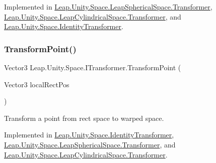 Implemented in \mbox{\hyperlink{class_leap_1_1_unity_1_1_space_1_1_leap_spherical_space_1_1_transformer_a959b6b39a26640ddbd4bcda77deefde5}{Leap.\+Unity.\+Space.\+Leap\+Spherical\+Space.\+Transformer}}, \mbox{\hyperlink{class_leap_1_1_unity_1_1_space_1_1_leap_cylindrical_space_1_1_transformer_a9ee37b1079bb46d1f4ae1e87cb3491f2}{Leap.\+Unity.\+Space.\+Leap\+Cylindrical\+Space.\+Transformer}}, and \mbox{\hyperlink{class_leap_1_1_unity_1_1_space_1_1_identity_transformer_a653673b36d9de3f837033af24b75da49}{Leap.\+Unity.\+Space.\+Identity\+Transformer}}.

\mbox{\label{interface_leap_1_1_unity_1_1_space_1_1_i_transformer_ad4ffef6002e74fe4967c4b7b9d5a5f74}} 
\subsubsection{\texorpdfstring{TransformPoint()}{TransformPoint()}}
{\footnotesize\ttfamily Vector3 Leap.\+Unity.\+Space.\+I\+Transformer.\+Transform\+Point (\begin{DoxyParamCaption}\item[{Vector3}]{local\+Rect\+Pos }\end{DoxyParamCaption})}



Transform a point from rect space to warped space. 



Implemented in \mbox{\hyperlink{class_leap_1_1_unity_1_1_space_1_1_identity_transformer_ab0c7ba8c98e532237b23e6bffb67becd}{Leap.\+Unity.\+Space.\+Identity\+Transformer}}, \mbox{\hyperlink{class_leap_1_1_unity_1_1_space_1_1_leap_spherical_space_1_1_transformer_a6ff15b9de7a7ca000bb2a565642a815e}{Leap.\+Unity.\+Space.\+Leap\+Spherical\+Space.\+Transformer}}, and \mbox{\hyperlink{class_leap_1_1_unity_1_1_space_1_1_leap_cylindrical_space_1_1_transformer_aa912ab55d4e9a20dcbfaff6717f688f9}{Leap.\+Unity.\+Space.\+Leap\+Cylindrical\+Space.\+Transformer}}.

\mbox{\label{interface_leap_1_1_unity_1_1_space_1_1_i_transformer_a69931f79b1e951cf38f1b3855e02ba91}} 
